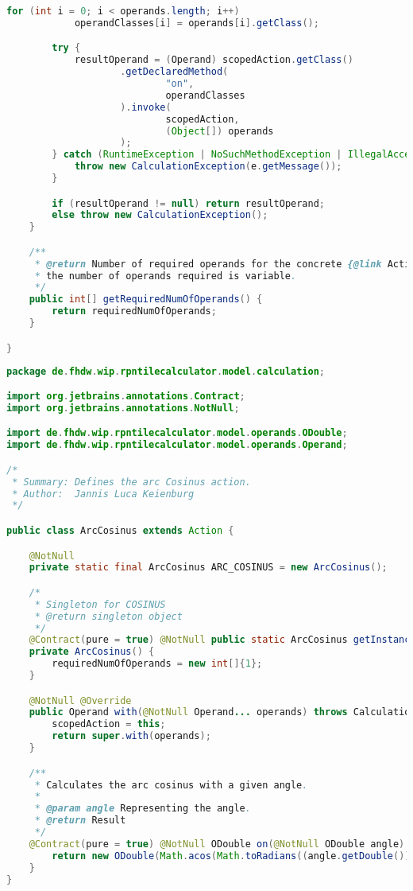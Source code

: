 \begin{lstlisting}[caption=Action (Schwenke),label=list:Action,language=Java]
        for (int i = 0; i < operands.length; i++)
            operandClasses[i] = operands[i].getClass();

        try {
            resultOperand = (Operand) scopedAction.getClass()
                    .getDeclaredMethod(
                            "on",
                            operandClasses
                    ).invoke(
                            scopedAction,
                            (Object[]) operands
                    );
        } catch (RuntimeException | NoSuchMethodException | IllegalAccessException | InvocationTargetException e) {
            throw new CalculationException(e.getMessage());
        }

        if (resultOperand != null) return resultOperand;
        else throw new CalculationException();
    }

    /**
     * @return Number of required operands for the concrete {@link Action}. If {@code -1}
     * the number of operands required is variable.
     */
    public int[] getRequiredNumOfOperands() {
        return requiredNumOfOperands;
    }

}
\end{lstlisting}    

\begin{lstlisting}[caption=ArcCosinus (Keienburg),label=list:ArcCosinus,language=Java]
package de.fhdw.wip.rpntilecalculator.model.calculation;

import org.jetbrains.annotations.Contract;
import org.jetbrains.annotations.NotNull;

import de.fhdw.wip.rpntilecalculator.model.operands.ODouble;
import de.fhdw.wip.rpntilecalculator.model.operands.Operand;

/*
 * Summary: Defines the arc Cosinus action.
 * Author:  Jannis Luca Keienburg
 */

public class ArcCosinus extends Action {

    @NotNull
    private static final ArcCosinus ARC_COSINUS = new ArcCosinus();

    /*
     * Singleton for COSINUS
     * @return singleton object
     */
    @Contract(pure = true) @NotNull public static ArcCosinus getInstance() { return ARC_COSINUS; }
    private ArcCosinus() {
        requiredNumOfOperands = new int[]{1};
    }

    @NotNull @Override
    public Operand with(@NotNull Operand... operands) throws CalculationException {
        scopedAction = this;
        return super.with(operands);
    }

    /**
     * Calculates the arc cosinus with a given angle.
     *
     * @param angle Representing the angle.
     * @return Result
     */
    @Contract(pure = true) @NotNull ODouble on(@NotNull ODouble angle) {
        return new ODouble(Math.acos(Math.toRadians((angle.getDouble()))));
    }
}
\end{lstlisting}    

